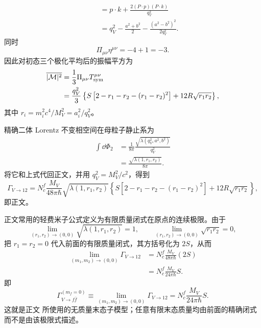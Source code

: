 \begin{derivation}
\begin{align*}
 &\quad=p\!\cdot\!k
 +\frac{2(P\!\cdot\!p)(P\!\cdot\!k)}{q_V^2}\\
 &\quad=q_V^2-\frac{a^2+b^2}{2}
 -\frac{(a^2-b^2)^2}{2q_V^2}.
\end{align*}
同时
\begin{equation*}
 \Pi_{\mu\nu}\eta^{\mu\nu}=-4+1=-3.
\end{equation*}
因此对初态三个极化平均后的振幅平方为
\begin{align*}
 \overline{|\mathcal M|^2}
 &=\frac13\Pi_{\mu\nu}T_{\rm sym}^{\mu\nu}\\
 &=\frac{q_V^2}{3}
 \left\{
 S\left[2-r_1-r_2-(r_1-r_2)^2\right]
 +12R\sqrt{r_1r_2}
 \right\},
\end{align*}
其中 $r_i=m_i^2c^4/M_V^2=a_i^2/q_V^2$。

精确二体 Lorentz 不变相空间在母粒子静止系为
\begin{align*}
 \int\dd\Phi_2
 &=\frac{1}{8\pi}
 \frac{\sqrt{\lambda(q_V^2,a^2,b^2)}}{q_V^2}\\
 &=\frac{\sqrt{\lambda(1,r_1,r_2)}}{8\pi}.
\end{align*}
将它和上式代回正文，并用
$q_V^2=M_V^2/c^2$，得到
\begin{equation*}
 \Gamma_{V\to12}
 =N_c^f\frac{M_V}{48\pi\hbar}\sqrt{\lambda(1,r_1,r_2)}
 \left\{
 S\left[2-r_1-r_2-(r_1-r_2)^2\right]
 +12R\sqrt{r_1r_2}
 \right\},
\end{equation*}
即正文。

正文常用的轻费米子公式定义为有限质量闭式在原点的连续极限。由于
\begin{equation*}
 \lim_{(r_1,r_2)\to(0,0)}\sqrt{\lambda(1,r_1,r_2)}=1,
 \qquad
 \lim_{(r_1,r_2)\to(0,0)}\sqrt{r_1r_2}=0,
\end{equation*}
把 $r_1=r_2=0$ 代入前面的有限质量闭式，其方括号化为 $2S$，从而
\begin{align*}
\lim_{(m_1,m_2)\to(0,0)}\Gamma_{V\to12}
&=N_c^f\frac{M_V}{48\pi\hbar}(2S)\\
&=N_c^f\frac{M_V}{24\pi\hbar}S.
\end{align*}
即
\begin{equation*}
 \boxed{
 \Gamma_{V\to f\bar f}^{(m_f=0)}
 \equiv
 \lim_{(m_1,m_2)\to(0,0)}\Gamma_{V\to12}
 =N_c^f\frac{M_V}{24\pi\hbar}S.}
\end{equation*}
这就是正文 所使用的无质量末态子模型；任意有限末态质量均由前面的精确闭式而不是由该极限式描述。


\end{derivation}
